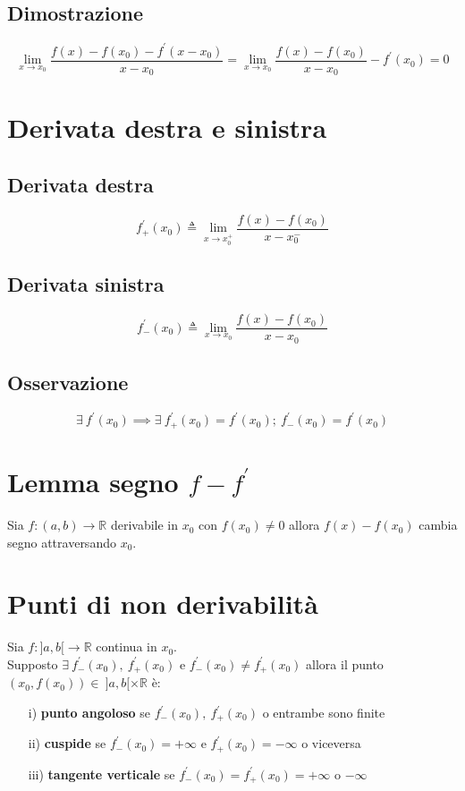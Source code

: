 \subsection{Dimostrazione}
\begin{equation}
\displaystyle \lim_{x \to x_0} \frac{f(x) - f(x_0) - f^{\prime}(x - x_0)}{x - x_0} = \lim_{x \to x_0} \frac{f(x) - f(x_0)}{x - x_0} - f^{\prime}(x_0) = 0
\end{equation}

\section{Derivata destra e sinistra}
\subsection{Derivata destra}
\begin{equation}
f^{\prime}_+(x_0) \triangleq \displaystyle \lim_{x \to x_0^+} \frac{f(x) - f(x_0)}{x - x_0^-}
\end{equation}
\subsection{Derivata sinistra}
\begin{equation}
f^{\prime}_-(x_0) \triangleq \displaystyle \lim_{x \to x_0} \frac{f(x) - f(x_0)}{x - x_0}
\end{equation}
\subsection{Osservazione}
\begin{equation}
\exists\ f^{\prime}(x_0) \implies \exists\ f^{\prime}_+(x_0) = f^{\prime}(x_0);\ f^{\prime}_-(x_0) = f^{\prime}(x_0)
\end{equation}

\section{Lemma segno $f - f^{\prime}$}
Sia $f: (a,b)  \to \mathbb{R}$ derivabile in $x_0$ con $f(x_0) \neq 0$ allora $f(x) - f(x_0)$ cambia segno attraversando $x_0$.

\section{Punti di non derivabilità}
Sia $f: ]a,b[  \to \mathbb{R}$ continua in $x_0$.\\
Supposto $\exists\ f^{\prime}_-(x_0),\ f^{\prime}_+(x_0)$ e $f^{\prime}_-(x_0) \neq f^{\prime}_+(x_0)$ allora il punto $(x_0, f(x_0)) \in \ ]a,b[ \times \mathbb{R}$ è:
\begin{enumerate}
\item[i)] \textbf{punto angoloso} se $f^{\prime}_-(x_0),\ f^{\prime}_+(x_0)$ o entrambe sono finite
\item[ii)] \textbf{cuspide} se $f^{\prime}_-(x_0) = +\infty$ e $f^{\prime}_+(x_0) = -\infty$ o viceversa
\item[iii)] \textbf{tangente verticale} se $f^{\prime}_-(x_0) = f^{\prime}_+(x_0) = +\infty$ o $-\infty$
\end{enumerate}

